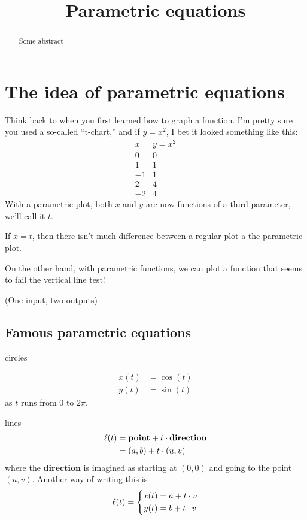 \documentclass{ximera}
\title[Dig-In:]{Parametric equations}
\begin{document}
\begin{abstract}
Some abstract
\end{abstract}
\maketitle

\section{The idea of parametric equations}

Think back to when you first learned how to graph a function. I'm
pretty sure you used a so-called ``t-chart,'' and if $y = x^2$, I bet it
looked something like this:
\[
\begin{array}{c|c}
  x & y = x^2\\\hline
  0 & 0 \\
  1 & 1\\
  -1 & 1\\
  2 & 4\\
  -2 & 4
\end{array}
\]
With a parametric plot, both $x$ and $y$ are now functions of a third
parameter, we'll call it $t$.


If $x=t$, then there isn't much difference between a regular plot a
the parametric plot.

On the other hand, with parametric functions, we can plot a function
that seems to fail the vertical line test!


(One input, two outputs)

\subsection{Famous parametric equations}

circles


\begin{align*}
  x(t) &= \cos(t)\\
  y(t) &= \sin(t)
\end{align*}
as $t$ runs from $0$ to $2\pi$.



lines
\begin{align*}
  \ell(t) &= \mathbf{point} + t\cdot \mathbf{direction}\\
  &= (a,b) + t \cdot(u,v)
\end{align*}
where the $\mathbf{direction}$ is imagined as starting at $(0,0)$ and going
to the point $(u,v)$. Another way of writing this is
\[
\ell(t) = \left\{\begin{aligned}
  x(t) &= a + t\cdot u\\
  y(t) &= b + t\cdot v
\end{aligned}\right.
\]
\end{document}
